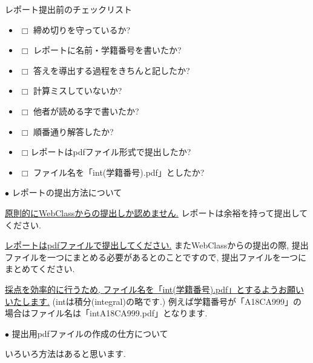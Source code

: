 \documentclass[dvipdfmx,a4paper,11pt]{article}
\theoremstyle{definition}
\begin{document}
 \begin{tcolorbox}[
    colback = white,
    colframe = black,
    fonttitle = \bfseries,
    breakable = true]
    レポート提出前のチェックリスト
    \begin{itemize}
    \item[] $\Box$ 締め切りを守っているか?
    \item[] $\Box$ レポートに名前・学籍番号を書いたか?
     \item[] $\Box$ 答えを導出する過程をきちんと記したか?
     \item[] $\Box$ 計算ミスしていないか?
    \item[] $\Box$ 他者が読める字で書いたか?
    \item[] $\Box$ 順番通り解答したか?
    \item[] $\Box$レポートはpdfファイル形式で提出したか?
   \item[] $\Box$ ファイル名を「int(学籍番号).pdf」としたか?
    \end{itemize}

  \end{tcolorbox}
  
 
\newpage
 \hspace{-11pt}
{\Large $\bullet$ レポートの提出方法について }
\vspace{11pt}

\underline{原則的にWebClassからの提出しか認めません.}
レポートは余裕を持って提出してください.
\vspace{11pt}

\underline{レポートはpdfファイルで提出してください.}
またWebClassからの提出の際, 提出ファイルを一つにまとめる必要があるとのことですので, 提出ファイルを一つにまとめてください.
\vspace{11pt}

\underline{採点を効率的に行うため, ファイル名を「int(学籍番号).pdf」とするようお願いいたします.}
(intは積分(integral)の略です.)
例えば学籍番号が「A18CA999」の場合はファイル名は「intA18CA999.pdf」となります.

\vspace{11pt}
 \hspace{-11pt}
{\Large $\bullet$ 提出用pdfファイルの作成の仕方について}
\vspace{11pt}

いろいろ方法はあると思います.
\vspace{11pt}
\end{document}
